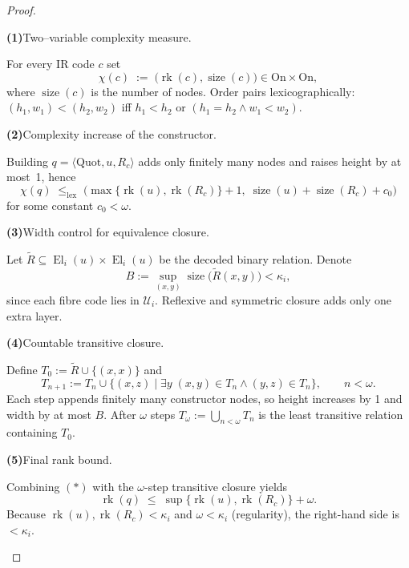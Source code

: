 \documentclass[a4paper,11pt]{article}
\newcommand{\El}{\operatorname{El}}          %
\newcommand{\Step}[2]{%
  \par\noindent\textbf{(#1)}\quad #2\par\nobreak
}
\begin{document}
\begin{proof}
\begin{linenumbers}

\Step{1}{Two–variable complexity measure.}
For every IR code $c$ set
\[
  \chi(c)\;:=\;\bigl(\operatorname{rk}(c),\operatorname{size}(c)\bigr)
  \in\mathrm{On}\times\mathrm{On},
\]
where $\operatorname{size}(c)$ is the number of nodes.
Order pairs lexicographically:
$(h_{1},w_{1})<(h_{2},w_{2})$ iff
$h_{1}<h_{2}$ or $(h_{1}=h_{2}\land w_{1}<w_{2})$.

\Step{2}{Complexity increase of the constructor.}
Building
$q=\langle\mathrm{Quot},u,R_c\rangle$
adds only finitely many nodes and raises height by at most~1, hence
\[
  \chi(q)
  \;\le_{\text{lex}}\;
  \bigl(\max\{\operatorname{rk}(u),\operatorname{rk}(R_c)\}+1,\;
        \operatorname{size}(u)+\operatorname{size}(R_c)+c_{0}\bigr)
\tag{$\ast$}
\]
for some constant $c_{0}<\omega$.

\Step{3}{Width control for equivalence closure.}
Let
$\tilde R\subseteq\El_i(u)\times\El_i(u)$
be the decoded binary relation.  Denote
\[
  B:=\sup_{(x,y)}\operatorname{size}\bigl(\tilde R(x,y)\bigr)
  <\kappa_{i},
\]
since each fibre code lies in $\mathcal U_{i}$.
Reflexive and symmetric closure adds only one extra layer.

\Step{4}{Countable transitive closure.}
Define $T_{0}:=\tilde R\cup\{(x,x)\}$ and
\[
  T_{n+1}:=T_{n}\cup\bigl\{(x,z)\mid\exists y\;(x,y)\in T_{n}
                                           \land(y,z)\in T_{n}\bigr\},
  \qquad n<\omega.
\]
Each step appends finitely many constructor nodes,
so height increases by 1 and width by at most $B$.
After $\omega$ steps
$T_{\omega}:=\bigcup_{n<\omega}T_{n}$
is the least transitive relation containing $T_{0}$.

\Step{5}{Final rank bound.}
Combining $(\ast)$ with the $\omega$-step transitive closure yields
\[
  \operatorname{rk}(q)
  \;\le\;
  \sup\{\operatorname{rk}(u),\operatorname{rk}(R_c)\}+\omega.
\]
Because $\operatorname{rk}(u),\operatorname{rk}(R_c)<\kappa_{i}$
and $\omega<\kappa_{i}$ (regularity),
the right-hand side is $<\kappa_{i}$.

\end{linenumbers}
\end{proof}


\end{document}
